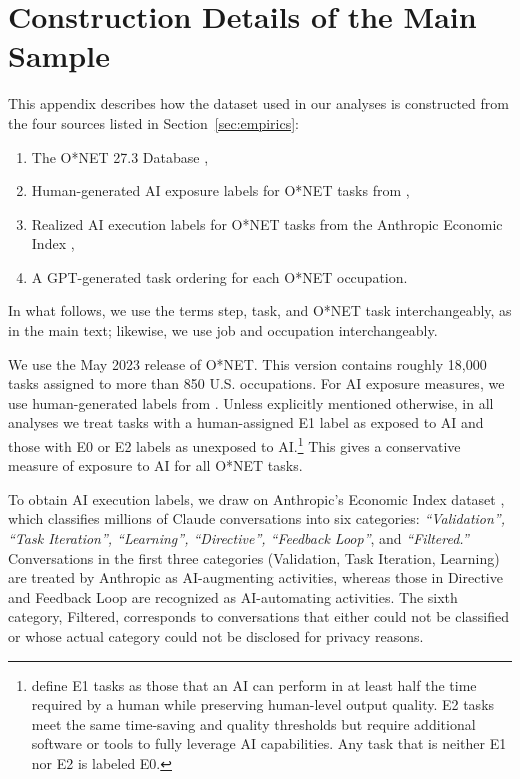 \section{Construction Details of the Main Sample}
\label{app:data_prep}

This appendix describes how the dataset used in our analyses is constructed from the four sources listed in Section~\ref{sec:empirics}:
\begin{enumerate}
    \item The O*NET 27.3 Database \citep{onet27_3},
    \item Human-generated AI exposure labels for O*NET tasks from \cite{eloundou2023gpts},
    \item Realized AI execution labels for O*NET tasks from the Anthropic Economic Index \citep{handa2025economictasksperformedai},
    \item A GPT-generated task ordering for each O*NET occupation.
\end{enumerate}
In what follows, we use the terms step, task, and O*NET task interchangeably, as in the main text; likewise, we use job and occupation interchangeably.

We use the May 2023 release of O*NET. 
This version contains roughly 18{,}000 tasks assigned to more than 850 U.S. occupations.
For AI exposure measures, we use human-generated labels from \cite{eloundou2023gpts}.
Unless explicitly mentioned otherwise, in all analyses we treat tasks with a human-assigned E1 label as exposed to AI and those with E0 or E2 labels as unexposed to AI.\footnote{
\cite{eloundou2023gpts} define E1 tasks as those that an AI can perform in at least half the time required by a human while preserving human-level output quality.
E2 tasks meet the same time-saving and quality thresholds but require additional software or tools to fully leverage AI capabilities.
Any task that is neither E1 nor E2 is labeled E0.
}
This gives a conservative measure of exposure to AI for all O*NET tasks.

To obtain AI execution labels, we draw on Anthropic's Economic Index dataset \citep{handa2025economictasksperformedai}, which classifies millions of Claude conversations into six categories: \textit{``Validation'', ``Task Iteration'', ``Learning'', ``Directive'', ``Feedback Loop''}, and \textit{``Filtered.''}
Conversations in the first three categories (Validation, Task Iteration, Learning) are treated by Anthropic as AI-augmenting activities, whereas those in Directive and Feedback Loop are recognized as AI-automating activities.
The sixth category, Filtered, corresponds to conversations that either could not be classified or whose actual category could not be disclosed for privacy reasons.

